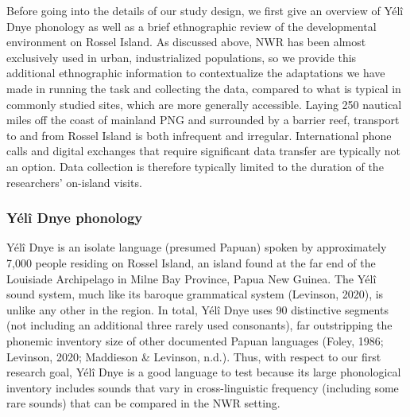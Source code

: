 \documentclass[english,,man,floatsintext]{apa6}
\begin{document}
Before going into the details of our study design, we first give an overview of Yélî Dnye phonology as well as a brief ethnographic review of the developmental environment on Rossel Island. As discussed above, NWR has been almost exclusively used in urban, industrialized populations, so we provide this additional ethnographic information to contextualize the adaptations we have made in running the task and collecting the data, compared to what is typical in commonly studied sites, which are more generally accessible. Laying 250 nautical miles off the coast of mainland PNG and surrounded by a barrier reef, transport to and from Rossel Island is both infrequent and irregular. International phone calls and digital exchanges that require significant data transfer are typically not an option. Data collection is therefore typically limited to the duration of the researchers' on-island visits.

\hypertarget{yuxe9luxee-dnye-phonology}{%
\subsubsection{Yélî Dnye phonology}\label{yuxe9luxee-dnye-phonology}}

Yélî Dnye is an isolate language (presumed Papuan) spoken by approximately 7,000 people residing on Rossel Island, an island found at the far end of the Louisiade Archipelago in Milne Bay Province, Papua New Guinea. The Yélî sound system, much like its baroque grammatical system (Levinson, 2020), is unlike any other in the region. In total, Yélî Dnye uses 90 distinctive segments (not including an additional three rarely used consonants), far outstripping the phonemic inventory size of other documented Papuan languages (Foley, 1986; Levinson, 2020; Maddieson \& Levinson, n.d.). Thus, with respect to our first research goal, Yélî Dnye is a good language to test because its large phonological inventory includes sounds that vary in cross-linguistic frequency (including some rare sounds) that can be compared in the NWR setting.
\end{document}
